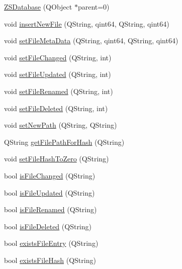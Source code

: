 \begin{DoxyCompactItemize}
\item 
\hyperlink{class_z_s_database_a0627c12fe47bbde3e1170a5af8c184e6}{Z\-S\-Database} (Q\-Object $\ast$parent=0)
\item 
void \hyperlink{class_z_s_database_ac9bbe47e47751f4a414ff490eaa93f37}{insert\-New\-File} (Q\-String, qint64, Q\-String, qint64)
\item 
void \hyperlink{class_z_s_database_ad4a7a82f99dea6cae6eb2984e753e617}{set\-File\-Meta\-Data} (Q\-String, qint64, Q\-String, qint64)
\item 
void \hyperlink{class_z_s_database_abffe5b56804a6ab22c1000823b933457}{set\-File\-Changed} (Q\-String, int)
\item 
void \hyperlink{class_z_s_database_a5f7c4cec7800e5a988aa7655e5d6aba0}{set\-File\-Updated} (Q\-String, int)
\item 
void \hyperlink{class_z_s_database_a2bb1f63e20f29941aaa22d6d45706227}{set\-File\-Renamed} (Q\-String, int)
\item 
void \hyperlink{class_z_s_database_a5d64e9036561661bbfbcead13d80e732}{set\-File\-Deleted} (Q\-String, int)
\item 
void \hyperlink{class_z_s_database_ab48b210e0768ec84a14c495b375f54e9}{set\-New\-Path} (Q\-String, Q\-String)
\item 
Q\-String \hyperlink{class_z_s_database_ad2900311b21e3e04e993b4dcb86b59b3}{get\-File\-Path\-For\-Hash} (Q\-String)
\item 
void \hyperlink{class_z_s_database_a0bed2c815150aa6355872605d2e0fcf5}{set\-File\-Hash\-To\-Zero} (Q\-String)
\item 
bool \hyperlink{class_z_s_database_a065508a7f918f70b815b62ac46b84fc5}{is\-File\-Changed} (Q\-String)
\item 
bool \hyperlink{class_z_s_database_a8956c2e63f50eb34c2a4752111921064}{is\-File\-Updated} (Q\-String)
\item 
bool \hyperlink{class_z_s_database_a73a368af71d0fbed197072462ad22b6b}{is\-File\-Renamed} (Q\-String)
\item 
bool \hyperlink{class_z_s_database_a5a73cbe4cf20c29083b2dd23268fbdc1}{is\-File\-Deleted} (Q\-String)
\item 
bool \hyperlink{class_z_s_database_a9b70013e15474dcaa8eec3cb7eb1e37c}{exists\-File\-Entry} (Q\-String)
\item 
bool \hyperlink{class_z_s_database_ae9f9794a28f8ed60d591b0db9c9d89e8}{exists\-File\-Hash} (Q\-String)
\item 

\end{DoxyCompactItemize}
